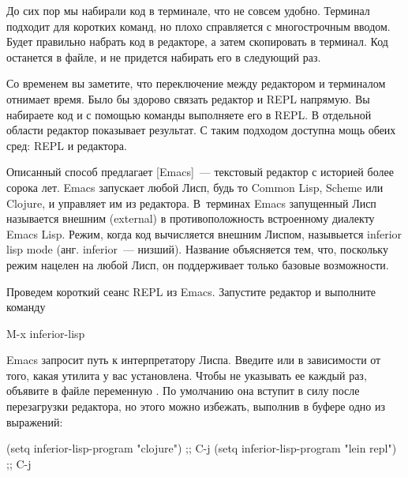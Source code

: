 
До сих пор мы набирали код в терминале, что не совсем удобно. Терминал подходит для коротких команд, но плохо справляется с многострочным вводом. Будет правильно набрать код в редакторе, а затем скопировать в терминал. Код останется в файле, и не придется набирать его в следующий раз.

Со временем вы заметите, что переключение между редактором и терминалом отнимает время. Было бы здорово связать редактор и REPL напрямую. Вы набираете код и с помощью команды выполняете его в REPL. В отдельной области редактор показывает результат. С таким подходом доступна мощь обеих сред: REPL и редактора.


\def\urlemacs{https://www.gnu.org/software/emacs/}

Описанный способ предлагает \footurl{Emacs}{\urlemacs}[Emacs]~--- текстовый редактор с историей более сорока лет. Emacs запускает любой Лисп, будь то Common Lisp, Scheme или Clojure, и управляет им из редактора. В~терминах Emacs запущенный Лисп называется внешним (external) в противоположность встроенному диалекту Emacs Lisp. Режим, когда код вычисляется внешним Лиспом, назывыется inferior lisp mode (анг. inferior~--- низший). Название объясняется тем, что, поскольку режим нацелен на любой Лисп, он поддерживает только базовые возможности.

Проведем короткий сеанс REPL из Emacs. Запустите редактор и выполните команду


\begin{english}
  \begin{text}
M-x inferior-lisp
  \end{text}
\end{english}

Emacs запросит путь к интерпретатору Лиспа. Введите  или  в зависимости от того, какая утилита у вас установлена. Чтобы не указывать ее каждый раз, объявите в файле  переменную . По умолчанию она вступит в силу после перезагрузки редактора, но этого можно избежать, выполнив в буфере  одно из выражений:

\begin{english}
  \begin{lisp}
(setq inferior-lisp-program "clojure") ;; C-j
(setq inferior-lisp-program "lein repl") ;; C-j
  \end{lisp}
\end{english}


